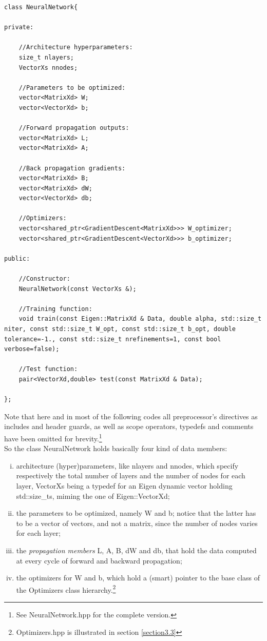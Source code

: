 \documentclass[12pt, a4paper]{report}
\theoremstyle{definition}
\begin{document}
\begin{lstlisting}[frame=single, name=neuralnet, showstringspaces=false]
class NeuralNetwork{

private:

	//Architecture hyperparameters:
	size_t nlayers;
	VectorXs nnodes;		

	//Parameters to be optimized:
	vector<MatrixXd> W;	
	vector<VectorXd> b;		

	//Forward propagation outputs:
	vector<MatrixXd> L; 	
	vector<MatrixXd> A;		

	//Back propagation gradients:
	vector<MatrixXd> B;		
	vector<MatrixXd> dW;
	vector<VectorXd> db;

	//Optimizers:
	vector<shared_ptr<GradientDescent<MatrixXd>>> W_optimizer;
	vector<shared_ptr<GradientDescent<VectorXd>>> b_optimizer;

public:

	//Constructor:
	NeuralNetwork(const VectorXs &);
	
	//Training function:
	void train(const Eigen::MatrixXd & Data, double alpha, std::size_t niter, const std::size_t W_opt, const std::size_t b_opt, double tolerance=-1., const std::size_t nrefinements=1, const bool verbose=false);
	
	//Test function:
	pair<VectorXd,double> test(const MatrixXd & Data);
	
};

\end{lstlisting}
\noindent Note that here and in most of the following codes all preprocessor's directives as includes and header guards, as well as scope operators, typedefs and comments have been omitted for brevity.\footnote{See NeuralNetwork.hpp for the complete version.}\\
So the class NeuralNetwork holds basically four kind of data members: 
\begin{enumerate}[(i)]
	\item\label{item:i} architecture (hyper)parameters, like {\ttfamily nlayers} and {\ttfamily nnodes}, which specify respectively the total number of layers and the number of nodes for each layer, {\ttfamily VectorXs} being a {\ttfamily typedef} for an Eigen dynamic vector holding {\ttfamily std::size\_t}s, miming the one of {\ttfamily Eigen::VectorXd};
	\item\label{item:ii} the parameters to be optimized, namely {\ttfamily W} and {\ttfamily b}; notice that the latter has to be a vector of vectors, and not a matrix, since the number of nodes varies for each layer;
	\item\label{item:iii} the \textit{propagation members} {\ttfamily L}, {\ttfamily A}, {\ttfamily B}, {\ttfamily dW} and {\ttfamily db}, that hold the data computed at every cycle of forward and backward propagation;
	\item \label{item:iv} the optimizers for {\ttfamily W} and {\ttfamily b}, which hold a (smart) pointer to the base class of the Optimizers class hierarchy.\footnote{Optimizers.hpp is illustrated in section \ref{section3.3}}
\end{enumerate}
\end{document}
